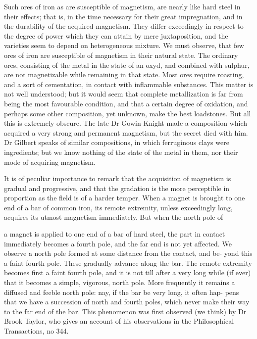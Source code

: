\documentclass{article}
\begin{document}
Such ores of iron as are susceptible of magnetism, are nearly like hard steel in their effects; that is, in the time necessary for their great impregnation, and in the durability of the acquired magnetism. They differ exceedingly in respect to the degree of power which they can attain by mere juxtaposition, and the varieties seem to depend on heterogeneous mixture. We must observe, that few ores of iron are susceptible of magnetism in their natural state. The ordinary ores, consisting of the metal in the state of an oxyd, and combined with sulphur, are not magnetizable while remaining in that state. Most ores require roasting, and a sort of cementation, in contact with inflammable substances. This matter is not well understood; but it would seem that complete metallization is far from being the most favourable condition, and that a certain degree of oxidation, and perhaps some other composition, yet unknown, make the best loadstones. But all this is extremely obscure. The late Dr Gowin Knight made a composition which acquired a very strong and permanent magnetism, but the secret died with him. Dr Gilbert speaks of similar compositions, in which ferruginous clays were ingredients; but we know nothing of the state of the metal in them, nor their mode of acquiring magnetism.

It is of peculiar importance to remark that the acquisition of magnetism is gradual and progressive, and that the gradation is the more perceptible in proportion as the field is of a harder temper. When a magnet is brought to one end of a bar of common iron, its remote extremity, unless exceedingly long, acquires its utmost magnetism immediately. But when the north pole of

a magnet is applied to one end of a bar of hard steel,
the part in contact immediately becomes a fourth pole,
and the far end is not yet affected. We observe a north
pole formed at some distance from the contact, and be-
yond this a faint fourth pole. These gradually advance
along the bar. The remote extremity becomes first a
faint fourth pole, and it is not till after a very long while
(if ever) that it becomes a simple, vigorous, north
pole. More frequently it remains a diffused and feeble
north pole: nay, if the bar be very long, it often hap-
pens that we have a succession of north and fourth poles,
which never make their way to the far end of the bar.
This phenomenon was first observed (we think) by Dr
Brook Taylor, who gives an account of his observations
in the Philosophical Transactions, no 344.
\end{document}

